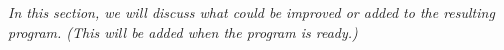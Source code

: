 \textit{In this section, we will discuss what could be improved or added to the resulting program. (This will be added when the program is ready.)}